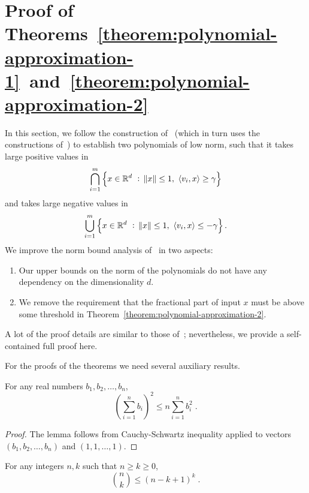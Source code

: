 \section{Proof of Theorems~\ref{theorem:polynomial-approximation-1}~and~\ref{theorem:polynomial-approximation-2}}
\label{section:proof-of-polynomial-approximation}

In this section, we follow the construction of~\citet{Klivans-Servedio-2008}
(which in turn uses the constructions of~\citet{Beigel-Reingold-Spielman-1995})
to establish two polynomials of low norm, such that it takes large positive values
in
\[ \bigcap_{i=1}^m \left\{ x \in \mathbb{R}^d ~:~ \norm{x} \le 1, \ \left\langle v_i, x \right\rangle \ge \gamma \right\} \]
and takes large negative values in
\[ \bigcup_{i=1}^m \left\{ x \in \mathbb{R}^d ~:~ \norm{x} \le 1, \ \left\langle v_i, x \right\rangle \le -\gamma \right\} . \]
We improve the norm bound analysis of~\citet{Klivans-Servedio-2008} in two aspects:
\begin{enumerate}
  \item Our upper bounds on the norm of the polynomials do not have any dependency on the
  dimensionality $d$.
  \item We remove the requirement that the fractional part of input $x$ must be above some threshold in
  Theorem~\ref{theorem:polynomial-approximation-2}.
\end{enumerate}
A lot of the proof details are similar to those of~\citet{Klivans-Servedio-2008}; nevertheless,
we provide a self-contained full proof here.

For the proofs of the theorems we need several auxiliary results.

\begin{lemma}
\label{lemma:simple-inequality}
For any real numbers $b_1, b_2, \dots, b_n$,
$$
\left( \sum_{i=1}^n b_i \right)^2 \le n \sum_{i=1}^n b_i^2 \; .
$$
\end{lemma}

\begin{proof}
The lemma follows from Cauchy-Schwartz inequality applied to
vectors $(b_1, b_2, \dots, b_n)$ and $(1,1,\dots,1)$.
\end{proof}

\begin{lemma}
\label{lemma:binomial-bound}
For any integers $n,k$ such that $n \ge k \ge 0$,
$$
\binom{n}{k} \le (n - k + 1)^k \; .
$$
\end{lemma}

